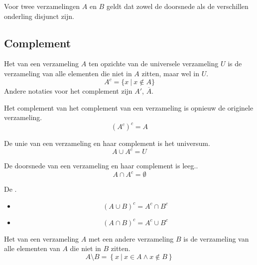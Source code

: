 \documentclass[main.tex]{subfiles}
\begin{document}
\begin{pr}
  Voor twee verzamelingen $A$ en $B$ geldt dat zowel de doorsnede als de verschillen onderling disjunct zijn.

\end{pr}

\subsection{Complement}
\label{sec:complement}

\begin{de}
  Het  van een verzameling $A$ ten opzichte van de universele verzameling $U$ is de verzameling van alle elementen die niet in $A$ zitten, maar wel in $U$.
  \[ A^{c} = \{ x\ |\ x \not\in A \} \]
  Andere notaties voor het complement zijn $A'$, $\overline{A}$. 
\end{de}

\begin{st}
  Het complement van het complement van een verzameling is opnieuw de originele verzameling.
  \[ (A^{c})^{c} = A\]

\end{st}

\begin{st}
  De unie van een verzameling en haar complement is het universum.
  \[ A \cup A^{c} = U \]

\end{st}

\begin{st}
  De doorsnede van een verzameling en haar complement is leeg..
  \[ A \cap A^{c} = \emptyset \]

\end{st}

\begin{st}
  De .
  \begin{itemize}
  \item \[ (A \cup B)^{c} = A^{c} \cap B^{c} \]
  \item \[ (A \cap B)^{c} = A^{c} \cup B^{c} \]
  \end{itemize}

\end{st}

\begin{de}
  Het  van een verzameling $A$ met een andere verzameling $B$ is de verzameling van alle elementen van $A$ die niet in $B$ zitten.
  \[ A \setminus B = \left\{ x\ |\ x \in A \wedge x \not\in B \right\} \]
\end{de}
\end{document}
